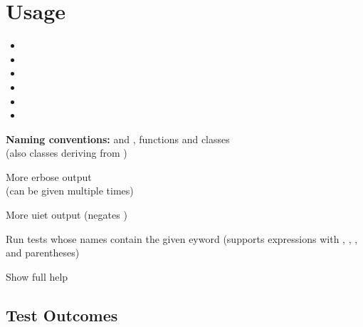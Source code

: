 
\section{Usage}

\begin{itemize}[itemsep=0mm]
    \item {}
    \item {}
    \item {}
    \item {}
    \item {}
    \item {}
\end{itemize}

\textbf{Naming conventions:}  and ,
 functions and  classes \\
(also classes deriving from )

\newcommand{\brightslash}{\textcolor{codebluebright}{/}}
\begin{description}[labelwidth=7.5em, leftmargin=!, itemsep=0mm]
    \item[\mono{-v} \brightslash{} \mono{--verbose}] More \textcolor{codeblue}{}erbose output \\ (can be given multiple times)
    \item[\mono{-q} \brightslash{} \mono{--quiet}] More \textcolor{codeblue}{}uiet output (negates )
    \item[\mono{-k} \emph{\mono[codebluebright]{"expression"}}] Run tests whose names contain the given \textcolor{codeblue}{}eyword (supports expressions with , , , and parentheses)
    \item[\mono{-h} \brightslash{} \mono{--help}] Show full help
\end{description}


\subsection{Test Outcomes}

